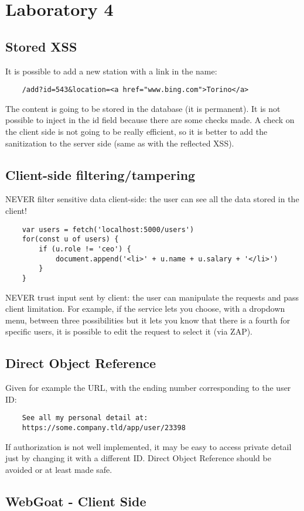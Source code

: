 \documentclass[a4paper, 10pt, titlepage]{article}
\begin{document}
\section{Laboratory 4}
\subsection{Stored XSS}
It is possible to add a new station with a link in the name:
\begin{lstlisting}
	/add?id=543&location=<a href="www.bing.com">Torino</a>
\end{lstlisting}
The content is going to be stored in the database (it is permanent).
It is not possible to inject in the id field because there are some checks made. A check on the client side is not going to be really efficient, so it is better to add the sanitization to the server side (same as with the reflected XSS).
\subsection{Client-side filtering/tampering}
NEVER filter sensitive data client-side: the user can see all the data stored in the client!
\begin{lstlisting}
	var users = fetch('localhost:5000/users')
	for(const u of users) {
		if (u.role != 'ceo') {
			document.append('<li>' + u.name + u.salary + '</li>')
		}
	}
\end{lstlisting}
NEVER trust input sent by client: the user can manipulate the requests and pass client limitation. For example, if the service lets you choose, with a dropdown menu, between three possibilities but it lets you know that there is a fourth for specific users, it is possible to edit the request to select it (via ZAP).

\subsection{Direct Object Reference}
Given for example the URL, with the ending number corresponding to the user ID:
\begin{lstlisting}
	See all my personal detail at:
	https://some.company.tld/app/user/23398
\end{lstlisting}
If authorization is not well implemented, it may be easy to access private detail just by changing it with a different ID. Direct Object Reference should be avoided or at least made safe.


\subsection{WebGoat - Client Side}
\end{document}
